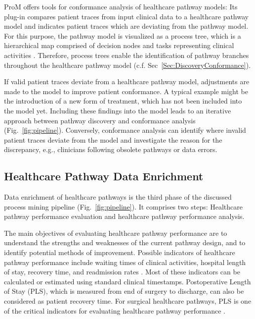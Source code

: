 ProM offers tools for conformance analysis of healthcare
pathway models: Its plug-in  compares
patient traces from input clinical data to a healthcare pathway model
and indicates patient traces which are deviating from the pathway
model.
For this purpose, the pathway model is visualized as a process tree,
which is a hierarchical map comprised of decision nodes and
tasks representing clinical activities
\cite{25a7fd818bf44606a903d9b78b95cdd3}.
Therefore, process trees enable the identification of pathway branches
throughout the healthcare pathway model (c.f. Sec~\ref{Sec:DiscoveryConformance}).

If valid patient traces deviate from a healthcare pathway model, 
adjustments are made to the model to improve patient conformance.
A typical example might be the introduction of a new form of
treatment, which has not been included into the model yet.
Including these findings into the model leads to an iterative approach
between pathway discovery and conformance analysis (Fig.~\ref{fig:pipeline}).
Conversely, conformance analysis can identify where invalid
patient traces deviate from the model and investigate the reason for
the discrepancy, e.g., clinicians following obsolete pathways or data errors.

\subsection{Healthcare Pathway Data Enrichment}
Data enrichment of healthcare pathways is the third phase of the
discussed process mining pipeline (Fig.~\ref{fig:pipeline}).
It comprises two steps: Healthcare pathway performance evaluation and
healthcare pathway performance analysis.

The main objectives of evaluating healthcare pathway performance are
to understand the strengths and weaknesses of the current pathway design,
and to identify potential methods of improvement. Possible indicators
of healthcare pathway performance include waiting times of clinical
activities, hospital length of stay, recovery time, and readmission
rates \cite{Rotter2008_pathways}.
Most of these indicators can be calculated or estimated using standard clinical timestamps. Postoperative Length of Stay (PLS), which is measured from end of surgery to discharge, can also be considered as patient recovery time.
For surgical healthcare pathways,  PLS is one of the critical indicators for evaluating healthcare pathway
performance \cite{Pearson2001_pathways}. 


